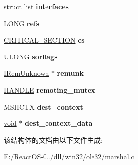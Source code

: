 \begin{DoxyCompactItemize}
\item 
\mbox{\label{structproxy__manager_afe6a5abb8beda3be13fa97fe3e1398d3}} 
\hyperlink{interfacestruct}{struct} \hyperlink{classlist}{list} {\bfseries interfaces}
\item 
\mbox{\label{structproxy__manager_a3b5989b9752d28661ca77f480cba172b}} 
L\+O\+NG {\bfseries refs}
\item 
\mbox{\label{structproxy__manager_a45da04f56a317ffaa7f8fc675b75dad2}} 
\hyperlink{struct___c_r_i_t_i_c_a_l___s_e_c_t_i_o_n}{C\+R\+I\+T\+I\+C\+A\+L\+\_\+\+S\+E\+C\+T\+I\+ON} {\bfseries cs}
\item 
\mbox{\label{structproxy__manager_abb4c09212f3036553afd5a3221a288af}} 
U\+L\+O\+NG {\bfseries sorflags}
\item 
\mbox{\label{structproxy__manager_afe68b388878af853fb5c3e7e359d2d6a}} 
\hyperlink{interface_i_rem_unknown}{I\+Rem\+Unknown} $\ast$ {\bfseries remunk}
\item 
\mbox{\label{structproxy__manager_ae461c07d795efdf2bd435e69e4bb2670}} 
\hyperlink{interfacevoid}{H\+A\+N\+D\+LE} {\bfseries remoting\+\_\+mutex}
\item 
\mbox{\label{structproxy__manager_a8d62b75dec1a822cd31a05ef1a724855}} 
M\+S\+H\+C\+TX {\bfseries dest\+\_\+context}
\item 
\mbox{\label{structproxy__manager_a3217b08ea7e9ea046c19dfe6efd2ed2a}} 
\hyperlink{interfacevoid}{void} $\ast$ {\bfseries dest\+\_\+context\+\_\+data}
\end{DoxyCompactItemize}


该结构体的文档由以下文件生成\+:\begin{DoxyCompactItemize}
\item 
E\+:/\+React\+O\+S-\/0../dll/win32/ole32/marshal.\+c\end{DoxyCompactItemize}
